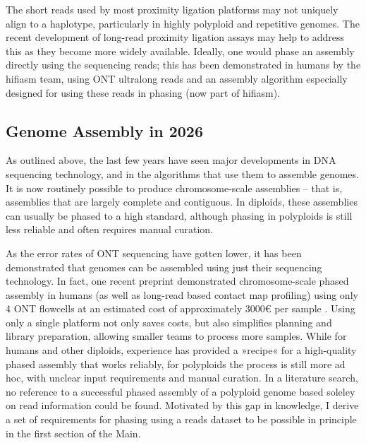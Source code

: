 The short reads used by most proximity ligation platforms may not uniquely align to a haplotype, particularly in highly polyploid and repetitive genomes.
The recent development of long-read proximity ligation assays may help to address this as they become more widely available.
Ideally, one would phase an assembly directly using the sequencing reads; this has been demonstrated in humans by the hifiasm team, using ONT ultralong reads and an assembly algorithm especially designed for using these reads in phasing (now part of hifiasm)\cite{cheng21}.

\subsection*{Genome Assembly in 2026}
As outlined above, the last few years have seen major developments in DNA sequencing technology, and in the algorithms that use them to assemble genomes.  
It is now routinely possible to produce chromosome-scale assemblies -- that is, assemblies that are largely complete and contiguous\cite{ebpseqrecs, sarashetti24}.
In diploids, these assemblies can usually be phased to a high standard, although phasing in polyploids is still less reliable and often requires manual curation.

As the error rates of ONT sequencing have gotten lower, it has been demonstrated that genomes can be assembled using just their sequencing technology\cite{ebpseqrecs, cheng26}. %
In fact, one recent preprint demonstrated chromosome-scale phased assembly in humans (as well as long-read based contact map profiling) using only 4 ONT flowcells at an estimated cost of approximately 3000€ per sample \cite{gross26}.
Using only a single platform not only saves costs, but also simplifies planning and library preparation, allowing smaller teams to process more samples.
While for humans and other diploids, experience has provided a »recipe« for a high-quality phased assembly that works reliably, for polyploids the process is still more ad hoc, with unclear input requirements and manual curation\cite{ebpseqrecs}.
In a literature search, no reference to a successful phased assembly of a polyploid genome based soleley on read information could be found.
Motivated by this gap in knowledge, I derive a set of requirements for phasing using a reads dataset to be possible in principle in the first section of the Main.


